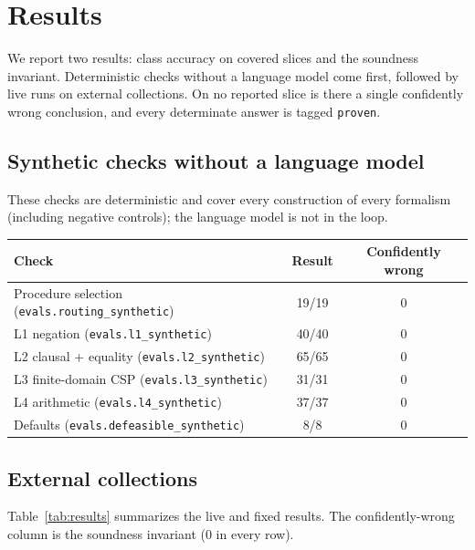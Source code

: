 \documentclass[11pt,a4paper]{article}
\begin{document}
\section{Results}
\label{sec:results}

We report two results: class accuracy on covered slices and the soundness invariant.
Deterministic checks without a language model come first, followed by live runs on external
collections. On no reported slice is there a single confidently wrong conclusion, and every
determinate answer is tagged \texttt{proven}.

\subsection{Synthetic checks without a language model}

These checks are deterministic and cover every construction of every formalism (including
negative controls); the language model is not in the loop.

\begin{center}
\begin{tabular}{lcc}
\toprule
\textbf{Check} & \textbf{Result} & \textbf{Confidently wrong} \\
\midrule
Procedure selection (\texttt{evals.routing\_synthetic}) & 19/19 & 0 \\
L1 negation (\texttt{evals.l1\_synthetic}) & 40/40 & 0 \\
L2 clausal + equality (\texttt{evals.l2\_synthetic}) & 65/65 & 0 \\
L3 finite-domain CSP (\texttt{evals.l3\_synthetic}) & 31/31 & 0 \\
L4 arithmetic (\texttt{evals.l4\_synthetic}) & 37/37 & 0 \\
Defaults (\texttt{evals.defeasible\_synthetic}) & 8/8 & 0 \\
\bottomrule
\end{tabular}
\end{center}

\subsection{External collections}

Table~\ref{tab:results} summarizes the live and fixed results. The confidently-wrong column
is the soundness invariant (0 in every row).
\end{document}
